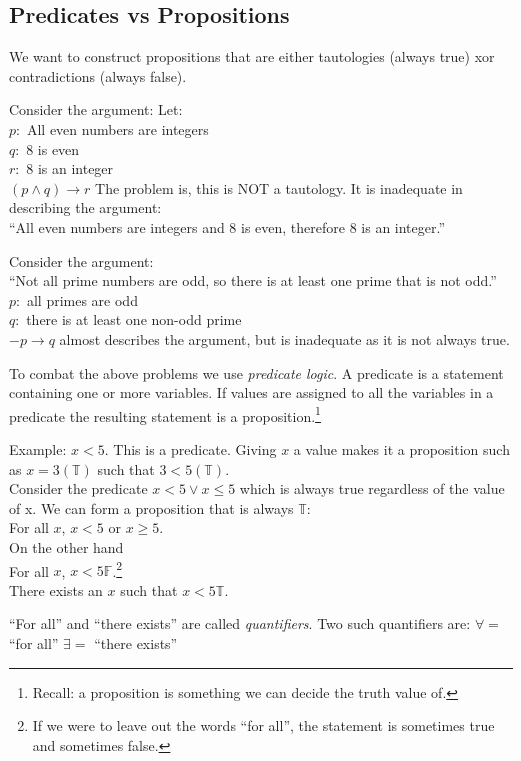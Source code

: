 \subsection{Predicates vs Propositions}
\label{sec:PredicatesVsPropositions}
We want to construct propositions that are either tautologies (always true) xor
contradictions (always false).

Consider the argument:
Let: \\
$p: $ All even numbers are integers\\
$q: $ 8 is even \\
$r: $ 8 is an integer \\
$(p \land q) \to r $
The problem is, this is NOT a tautology. It is inadequate in describing the
argument: \\
``All even numbers are integers and 8 is even, therefore 8 is an integer.''

Consider the argument: \\
``Not all prime numbers are odd, so there is at least one prime that is not
odd.''\\
$p: $ all primes are odd \\
$q: $ there is at least one non-odd prime \\
$-p \to q$ almost describes the argument, but is inadequate as it is not always
true.

To combat the above problems we use \emph{predicate logic}. A predicate is a
statement containing one or more variables. If values are assigned to all the
variables in a predicate the resulting statement is a
proposition.\footnote{Recall: a proposition is something we can decide the truth
value of.}

Example: $x < 5$. This is a predicate. Giving $x$ a value makes it a proposition
such as $x = 3 (\mathbb{T})$ such that $3 < 5 (\mathbb{T})$. \\
Consider the predicate $x < 5 \lor x \leq 5$ which is always true regardless of
the value of x.
We can form a proposition that is always $\mathbb{T}$:\\
For all $x$, $x<5$ or $x \geq 5$. \\
On the other hand \\
For all $x$, $x < 5 \mathbb{F}$.\footnote{If we were to leave out the
words ``for all'', the statement is sometimes true and sometimes false.}\\

There exists an $x$ such that $x < 5 \mathbb{T}$.

``For all'' and ``there exists'' are called \emph{quantifiers}. Two such
quantifiers are:
$\forall =$ ``for all''
$\exists =$ ``there exists''

